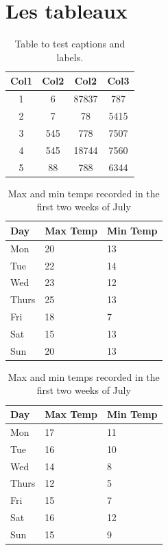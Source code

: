 \documentclass[a4paper,11pt]{report}    %
\begin{document}
\section{Les tableaux}

\begin{table}[H]
\centering
\begin{tabular}{||c c c c||} 
 \hline
 Col1 & Col2 & Col2 & Col3 \\ [0.5ex] 
 \hline\hline
 1 & 6 & 87837 & 787 \\ 
 2 & 7 & 78 & 5415 \\
 3 & 545 & 778 & 7507 \\
 4 & 545 & 18744 & 7560 \\
 5 & 88 & 788 & 6344 \\ [1ex] 
 \hline
\end{tabular}
\caption{Table to test captions and labels.}
\label{table:1}
\end{table}

\begin{table}[H]
    \begin{subtable}[h]{0.45\textwidth}
        \centering
        \begin{tabular}{l | l | l}
        Day & Max Temp & Min Temp \\
        \hline \hline
        Mon & 20 & 13\\
        Tue & 22 & 14\\
        Wed & 23 & 12\\
        Thurs & 25 & 13\\
        Fri & 18 & 7\\
        Sat & 15 & 13\\
        Sun & 20 & 13
       \end{tabular}
       \caption{First Week}
       \label{subtab:week1}
    \end{subtable}%
    \hfill
    \begin{subtable}[h]{0.45\textwidth}
        \centering
        \begin{tabular}{l | l | l}
        Day & Max Temp & Min Temp \\
        \hline \hline
        Mon & 17 & 11\\
        Tue & 16 & 10\\
        Wed & 14 & 8\\
        Thurs & 12 & 5\\
        Fri & 15 & 7\\
        Sat & 16 & 12\\
        Sun & 15 & 9
        \end{tabular}
        \caption{Second Week}
        \label{subtab:week2}
     \end{subtable}
     \caption{Max and min temps recorded in the first two weeks of July}
     \label{tab:temps}
\end{table}
\end{document}
